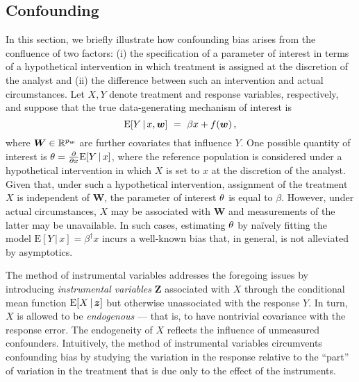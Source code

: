 \documentclass{uwstat572}
\newcommand{\be}{\begin{equation}}
\newcommand{\ee}{\end{equation}}
\theoremstyle{definition}
\theoremstyle{remark}
\newcommand{\R}{\ensuremath{\mathbb{R}}}
\newcommand{\gb}{\beta}
\newcommand{\gep}{\epsilon}
\newcommand{\pdd}[2]{\frac{\partial #1}{\partial #2}}
\newcommand{\E}{\mathrm{E}}
\newcommand{\bs}[1]{\boldsymbol{#1}}
\numberwithin{equation}{section}
\begin{document}
%

\subsection{Confounding}\label{ss:conf}
\newcommand{\efc}{\bs{\gamma}}
\newcommand{\W}{\bs{W}}
\newcommand{\Z}{\bs{Z}}
\newcommand{\erry}{\gep}
\newcommand{\pd}{\partial}

In this section, we briefly illustrate how confounding bias arises from the confluence of two factors: (i) the specification of a parameter of interest in terms of a hypothetical intervention in which treatment is assigned at the discretion of the analyst and (ii) the difference between such an intervention and actual circumstances. Let $X, Y$ denote treatment and response variables, respectively, and suppose that the true data-generating mechanism of interest is
\be\label{eq:conf1}
	\E[Y\,|\,x, \w] \ = \ \gb x + f(\w) \,, %
\ee
where $\W\in\R^\pw$ are further covariates that influence $Y$. One possible quantity of interest is $\eft = \pdd{}{x}\E[Y\,|\,x]$, where the reference population is considered under a hypothetical intervention in which $X$ is set to $x$ at the discretion of the analyst. Given that, under such a hypothetical intervention, assignment of the treatment $X$ is independent of $\W$, the parameter of interest $\theta$ is equal to $\gb$. However, under actual circumstances, $X$ may be associated with $\W$ and measurements of the latter may be unavailable. In such cases, estimating $\theta$ by na\"ively fitting the model $\E[Y\,|\,x] = \gb^\dagger x$ incurs a well-known bias that, in general, is not alleviated by asymptotics.
 
The method of instrumental variables addresses the foregoing issues by introducing \emph{instrumental variables} $\Z$ associated with $X$ through the conditional mean function $\E[X\,|\,\z]$ but otherwise unassociated with the response $Y$. In turn, $X$ is allowed to be \emph{endogenous} --- that is, to have nontrivial covariance with the response error. The endogeneity of $X$ reflects the influence of unmeasured confounders. Intuitively, the method of instrumental variables circumvents confounding bias by studying the variation in the response relative to the ``part'' of variation in the treatment that is due only to the effect of the instruments. 

\end{document}
